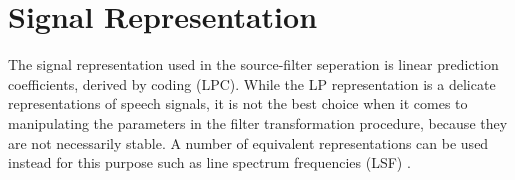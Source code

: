 % 
% 
% 
% 

\section{Signal Representation} %
\label{sec:signal_representation}
The signal representation used in the source-filter seperation is linear prediction coefficients, derived by coding (LPC). While the LP representation is a delicate representations of speech signals, it is not the best choice when it comes to manipulating the parameters in the filter transformation procedure, because they are not necessarily stable. A number of equivalent representations can be used instead for this purpose such as line spectrum frequencies (LSF) \cite{taletek}.


